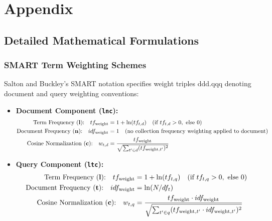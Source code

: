 \documentclass[10pt,a4paper,twocolumn]{article}
\begin{document}



\clearpage
\onecolumn
\appendix
\section*{Appendix}
\renewcommand{\thesubsection}{\Alph{subsection}}

\subsection{Detailed Mathematical Formulations}
\label{app:math}

\subsubsection{SMART Term Weighting Schemes}
Salton and Buckley's SMART notation specifies weight triples $\text{ddd.qqq}$ denoting document and query weighting conventions:
\begin{itemize}
    \item \textbf{Document Component (\texttt{lnc}):}
    \begin{align}
        \text{Term Frequency (\textbf{l}):} \quad tf_{\text{weight}} &= 1 + \ln(tf_{t,d}) \quad (\text{if } tf_{t,d} > 0, \text{ else } 0) \\
        \text{Document Frequency (\textbf{n}):} \quad idf_{\text{weight}} &= 1 \quad (\text{no collection frequency weighting applied to document}) \\
        \text{Cosine Normalization (\textbf{c}):} \quad w_{t,d} &= \frac{tf_{\text{weight}}}{\sqrt{\sum_{t' \in d} (tf_{\text{weight}, t'})^2}}
    \end{align}
    \item \textbf{Query Component (\texttt{ltc}):}
    \begin{align}
        \text{Term Frequency (\textbf{l}):} \quad tf_{\text{weight}} &= 1 + \ln(tf_{t,q}) \quad (\text{if } tf_{t,q} > 0, \text{ else } 0) \\
        \text{Document Frequency (\textbf{t}):} \quad idf_{\text{weight}} &= \ln(N / df_t) \\
        \text{Cosine Normalization (\textbf{c}):} \quad w_{t,q} &= \frac{tf_{\text{weight}} \cdot idf_{\text{weight}}}{\sqrt{\sum_{t' \in q} (tf_{\text{weight}, t'} \cdot idf_{\text{weight}, t'})^2}}
    \end{align}
\end{itemize}
\end{document}
